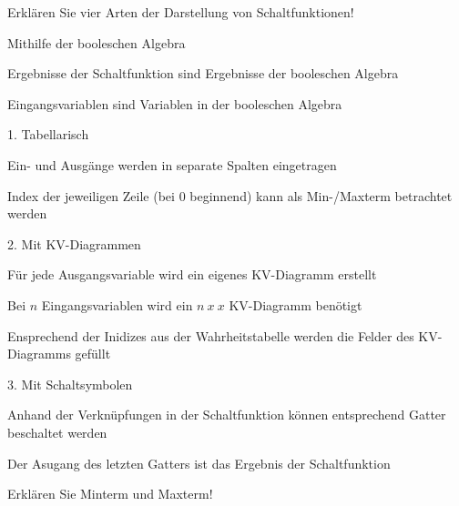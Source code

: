 \documentclass
[
  draft    = true,
  fontsize = 11pt,
  parskip  = half-,
  BCOR     = 0pt,
  DIV      = 11,
  ngerman,
  dvipsnames
]
{scrartcl}
\begin{document}
\begin{mytemize}
  \item Erklären Sie vier Arten der Darstellung von Schaltfunktionen!
        \begin{karsten}
          \begin{mytemize}
              \item Mithilfe der booleschen Algebra
                \begin{mytemize}
                  \item Ergebnisse der Schaltfunktion sind Ergebnisse der booleschen Algebra
                  \item Eingangsvariablen sind Variablen in der booleschen Algebra
                \end{mytemize}	
              \item 1. Tabellarisch
                \begin{mytemize}
                  \item Ein- und Ausgänge werden in separate Spalten eingetragen
                  \item Index der jeweiligen Zeile (bei 0 beginnend) kann als Min-/Maxterm betrachtet werden
                \end{mytemize}	
              \item 2. Mit KV-Diagrammen
                \begin{mytemize}
                  \item Für jede Ausgangsvariable wird ein eigenes KV-Diagramm erstellt
                  \item Bei $n$ Eingangsvariablen wird ein $n\ x\ x$ KV-Diagramm benötigt
                  \item Ensprechend der Inidizes aus der Wahrheitstabelle werden die Felder des KV-Diagramms gefüllt 
                \end{mytemize}
              \item 3. Mit Schaltsymbolen
                \begin{mytemize}
                  \item Anhand der Verknüpfungen in der Schaltfunktion können entsprechend Gatter beschaltet werden
                  \item Der Asugang des letzten Gatters ist das Ergebnis der Schaltfunktion
                \end{mytemize}
          \end{mytemize}
        \end{karsten}
  \item Erklären Sie Minterm und Maxterm!
        \begin{achim}

\end{achim}
\end{mytemize}
\end{document}

